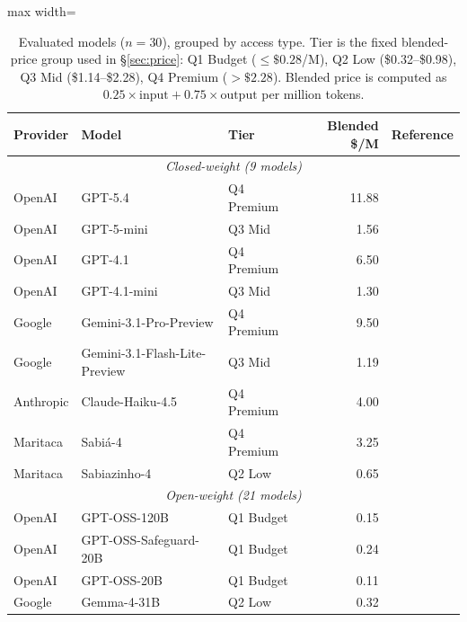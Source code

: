 \documentclass{article}
\begin{document}
\begin{table}[h]
\centering
\small
\caption{Evaluated models ($n=30$), grouped by access type. Tier is the fixed blended-price group used in \S\ref{sec:price}: Q1 Budget ($\leq\$0.28$/M), Q2 Low (\$0.32--\$0.98), Q3 Mid (\$1.14--\$2.28), Q4 Premium ($>\$2.28$). Blended price is computed as $0.25\times\text{input} + 0.75\times\text{output}$ per million tokens.}
\label{tab:models}
\begin{adjustbox}{max width=\linewidth}
\begin{tabular}{lllrl}
\toprule
\textbf{Provider} & \textbf{Model} & \textbf{Tier} & \textbf{Blended \$/M} & \textbf{Reference} \\
\midrule
\multicolumn{5}{c}{\textit{Closed-weight (9 models)}} \\
\midrule
OpenAI     & GPT-5.4                       & Q4 Premium & 11.88 & \citep{openai2025gpt5} \\
OpenAI     & GPT-5-mini                    & Q3 Mid     &  1.56 & \citep{openai2025gpt5} \\
OpenAI     & GPT-4.1                       & Q4 Premium &  6.50 & \citep{openai2023gpt4} \\
OpenAI     & GPT-4.1-mini                  & Q3 Mid     &  1.30 & \citep{openai2023gpt4} \\
Google     & Gemini-3.1-Pro-Preview        & Q4 Premium &  9.50 & \citep{deepmind2025gemini3pro} \\
Google     & Gemini-3.1-Flash-Lite-Preview & Q3 Mid     &  1.19 & \citep{deepmind2025gemini3pro} \\
Anthropic  & Claude-Haiku-4.5              & Q4 Premium &  4.00 & \citep{anthropic2025haiku45} \\
Maritaca   & Sabi\'{a}-4                   & Q4 Premium &  3.25 & \citep{laitz2026sabia4} \\
Maritaca   & Sabiazinho-4                  & Q2 Low     &  0.65 & \citep{laitz2026sabia4} \\
\midrule
\multicolumn{5}{c}{\textit{Open-weight (21 models)}} \\
\midrule
OpenAI     & GPT-OSS-120B                  & Q1 Budget  &  0.15 & \citep{openai2025gptoss} \\
OpenAI     & GPT-OSS-Safeguard-20B         & Q1 Budget  &  0.24 & \citep{openai2025gptosssafeguard} \\
OpenAI     & GPT-OSS-20B                   & Q1 Budget  &  0.11 & \citep{openai2025gptoss} \\
Google     & Gemma-4-31B                   & Q2 Low     &  0.32 & \citep{gemma2025gemma3} \\

\end{tabular}
\end{adjustbox}
\end{table}
\end{document}

